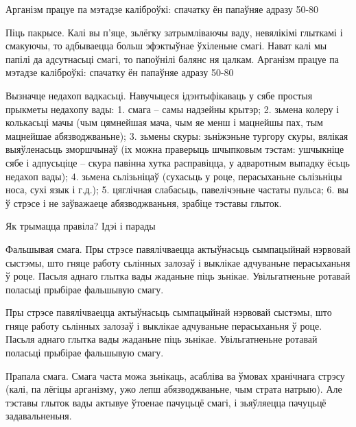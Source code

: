 Арганізм працуе па мэтадзе каліброўкі: спачатку ён папаўняе адразу 50-80%

Піць пакрысе.
Калі вы п'яце, зьлёгку затрымліваючы ваду, невялікімі глыткамі і смакуючы, то адбываецца больш эфэктыўнае ўхіленьне смагі. Нават калі мы папілі да адсутнасьці смагі, то папоўнілі балянс ня цалкам. Арганізм працуе па мэтадзе каліброўкі: спачатку ён папаўняе адразу 50-80%

Вызначце недахоп вадкасьці. Навучыцеся ідэнтыфікаваць у сябе простыя прыкметы недахопу вады:
1. смага – самы надзейны крытэр;
2. зьмена колеру і колькасьці мачы (чым цямнейшая мача, чым яе менш і мацнейшы пах, тым мацнейшае абязводжваньне);
3. зьмены скуры: зьніжэньне тургору скуры, вялікая выяўленасьць зморшчынаў (іх можна праверыць шчыпковым тэстам: ушчыкніце сябе і адпусьціце – скура павінна хутка расправіцца, у адваротным выпадку ёсьць недахоп вады);
4. зьмена сьлізьніцаў (сухасьць у роце, перасыханьне сьлізьніцы носа, сухі язык і г.д.);
5. цяглічная слабасьць, павелічэньне частаты пульса;
6. вы ў стрэсе і не заўважаеце абязводжваньня, зрабіце тэставы глыток.

Як трымацца правіла? Ідэі і парады

Фальшывая смага.
Пры стрэсе павялічваецца актыўнасьць сымпацыйнай нэрвовай сыстэмы, што гняце работу сьлінных залозаў і выклікае адчуваньне перасыханьня ў роце. Пасьля аднаго глытка вады жаданьне піць зьнікае. Увільгатненьне ротавай поласьці прыбірае фальшывую смагу.

Пры стрэсе павялічваецца актыўнасьць сымпацыйнай нэрвовай сыстэмы, што гняце работу сьлінных залозаў і выклікае адчуваньне перасыханьня ў роце. Пасьля аднаго глытка вады жаданьне піць зьнікае. Увільгатненьне ротавай поласьці прыбірае фальшывую смагу.

Прапала смага.
Смага часта можа зьнікаць, асабліва ва ўмовах хранічнага стрэсу (калі, па лёгіцы арганізму, ужо лепш абязводжваньне, чым страта натрыю). Але тэставы глыток вады актывуе ўтоенае пачуцьцё смагі, і зьяўляецца пачуцьцё задавальненьня.

